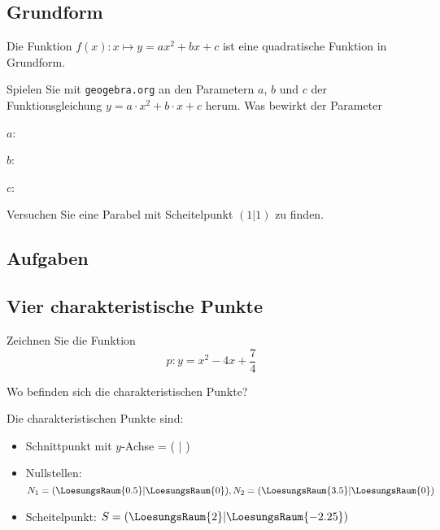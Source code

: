 \subsection{Grundform}
Die Funktion $f(x): x \mapsto y = ax^2 + bx +c$ ist eine
quadratische Funktion in Grundform.

Spielen Sie mit  \texttt{geogebra.org} an den Parametern $a$, $b$ und $c$ der Funktionsgleichung $y = a\cdot{}x^2 + b\cdot{} x + c$ herum. Was bewirkt der Parameter

$a$: 

$b$: 

$c$: 

Versuchen Sie eine Parabel mit Scheitelpunkt $(1|1)$ zu finden.

\subsection*{Aufgaben}

\newpage

\subsection{Vier charakteristische Punkte}
Zeichnen Sie die Funktion
$$p: y = x^2 - 4x + \frac{7}{4}$$


Wo befinden sich die charakteristischen Punkte?



Die charakteristischen Punkte sind:
\begin{itemize}
\item Schnittpunkt mit $y$-Achse = ( | )
\item Nullstellen: $N_1=(\LoesungsRaum{0.5}| \LoesungsRaum{0}), N_2=( \LoesungsRaum{3.5}|\LoesungsRaum{0})$
\item Scheitelpunkt: $S=(\LoesungsRaum{2}|\LoesungsRaum{-2.25})$
\end{itemize}
 
